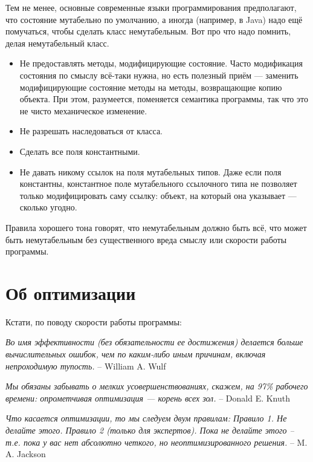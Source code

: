 \documentclass[a5paper]{article}
\begin{document}
Тем не менее, основные современные языки программирования предполагают, что состояние мутабельно по умолчанию, а иногда (например, в Java) надо ещё помучаться, чтобы сделать класс немутабельным. Вот про что надо помнить, делая немутабельный класс.

\begin{itemize}
    \item Не предоставлять методы, модифицирующие состояние. Часто модификация состояния по смыслу всё-таки нужна, но есть полезный приём --- заменить модифицирующие состояние методы на методы, возвращающие копию объекта. При этом, разумеется, поменяется семантика программы, так что это не чисто механическое изменение.
    \item Не разрешать наследоваться от класса.
    \item Сделать все поля константными.
    \item Не давать никому ссылок на поля мутабельных типов. Даже если поля константны, константное поле мутабельного ссылочного типа не позволяет только модифицировать саму ссылку: объект, на который она указывает --- сколько угодно.
\end{itemize}

Правила хорошего тона говорят, что немутабельным должно быть всё, что может быть немутабельным без существенного вреда смыслу или скорости работы программы.

\section{Об оптимизации}

Кстати, по поводу скорости работы программы:

\textit{Во имя эффективности (без обязательности ее достижения) делается больше вычислительных ошибок, чем по каким-либо иным причинам, включая непроходимую тупость.} \newline
-- William A. Wulf 

\textit{Мы обязаны забывать о мелких усовершенствованиях, ска­жем, на 97\% рабочего времени: опрометчивая оптимизация --- корень всех зол.} \newline
-- Donald E. Knuth

\textit{Что касается оптимизации, то мы следуем двум правилам: \newline
Правило 1. Не делайте этого. \newline
Правило 2 (только для экспертов). Пока не делайте этого -- т.е. пока у вас нет абсолютно четкого, но неоптимизированного решения.} \newline
-- M. A. Jackson
\end{document}
